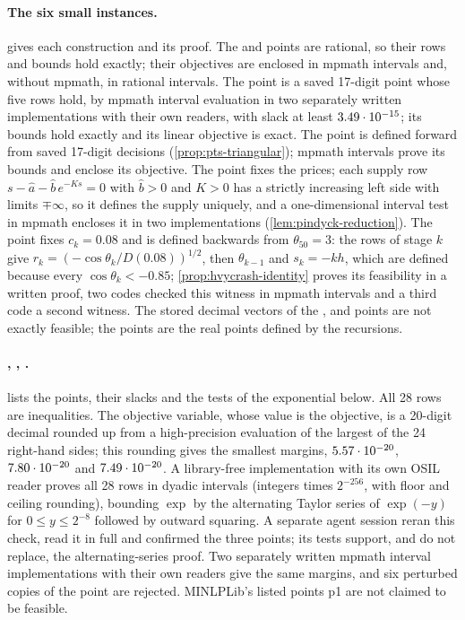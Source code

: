 \paragraph{The six small instances.}
 gives each construction and its proof.
The  and  points are rational, so their rows and bounds hold exactly; their objectives are enclosed in mpmath intervals and, without mpmath, in rational intervals.
The  point is a saved 17-digit point whose five rows hold, by mpmath interval evaluation in two separately written implementations with their own readers, with slack at least $3.49\cdot 10^{-15}$; its bounds hold exactly and its linear objective is exact.
The  point is defined forward from saved 17-digit decisions (\cref{prop:pts-triangular}); mpmath intervals prove its bounds and enclose its objective.
The  point fixes the prices; each supply row $s-\hat a-\hat b\,e^{-Ks}=0$ with $\hat b>0$ and $K>0$ has a strictly increasing left side with limits $\mp\infty$, so it defines the supply uniquely, and a one-dimensional interval test in mpmath encloses it in two implementations (\cref{lem:pindyck-reduction}).
The  point fixes $c_k=0.08$ and is defined backwards from $\theta_{50}=3$: the rows of stage $k$ give $r_k=(-\cos\theta_k/D(0.08))^{1/2}$, then $\theta_{k-1}$ and $s_k=-kh$, which are defined because every $\cos\theta_k<-0.85$; \cref{prop:hvycrash-identity} proves its feasibility in a written proof, two codes checked this witness in mpmath intervals and a third code a second witness.
The stored decimal vectors of the ,  and  points are not exactly feasible; the points are the real points defined by the recursions.

\paragraph{, , .}
 lists the points, their slacks and the tests of the exponential below.
All 28 rows are inequalities.
The objective variable, whose value is the objective, is a 20-digit decimal rounded up from a high-precision evaluation of the largest of the 24 right-hand sides; this rounding gives the smallest margins, $5.57\cdot 10^{-20}$, $7.80\cdot 10^{-20}$ and $7.49\cdot 10^{-20}$.
A library-free implementation with its own OSIL reader proves all 28 rows in dyadic intervals (integers times $2^{-256}$, with floor and ceiling rounding), bounding $\exp$ by the alternating Taylor series of $\exp(-y)$ for $0\le y\le2^{-8}$ followed by outward squaring.
A separate agent session reran this check, read it in full and confirmed the three points; its tests support, and do not replace, the alternating-series proof.
Two separately written mpmath interval implementations with their own readers give the same margins, and six perturbed copies of the  point are rejected.
MINLPLib's listed points p1 are not claimed to be feasible.


